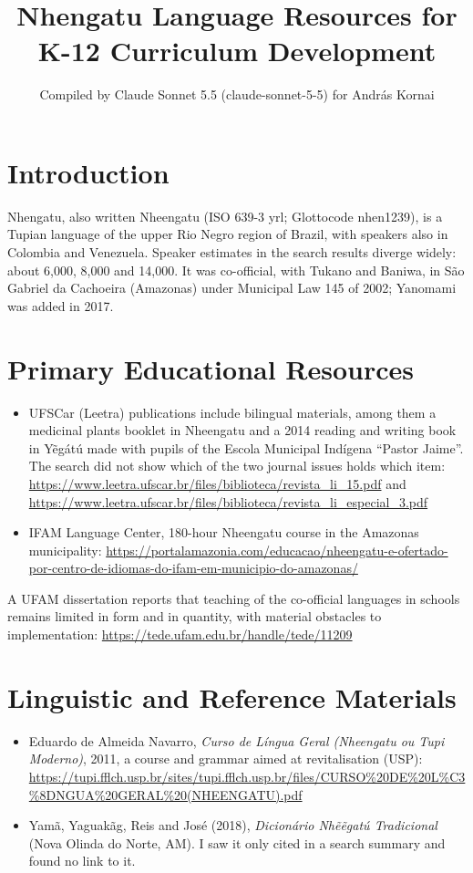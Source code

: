 \documentclass[12pt]{article}
\title{Nhengatu Language Resources for K-12 Curriculum Development}
\author{Compiled by Claude Sonnet 5.5 (claude-sonnet-5-5) for Andr\'as Kornai}
\date{}
\begin{document}
\maketitle

\section{Introduction}
Nhengatu, also written Nheengatu (ISO 639-3 yrl; Glottocode nhen1239), is a Tupian language of the upper Rio Negro region of Brazil, with speakers also in Colombia and Venezuela. Speaker estimates in the search results diverge widely: about 6,000, 8,000 and 14,000. It was co-official, with Tukano and Baniwa, in S\~ao Gabriel da Cachoeira (Amazonas) under Municipal Law 145 of 2002; Yanomami was added in 2017.

\section{Primary Educational Resources}
\begin{itemize}
\item UFSCar (Leetra) publications include bilingual materials, among them a medicinal plants booklet in Nheengatu and a 2014 reading and writing book in Y\~eg\'at\'u made with pupils of the Escola Municipal Ind\'igena ``Pastor Jaime''. The search did not show which of the two journal issues holds which item: \url{https://www.leetra.ufscar.br/files/biblioteca/revista_li_15.pdf} and \url{https://www.leetra.ufscar.br/files/biblioteca/revista_li_especial_3.pdf}
\item IFAM Language Center, 180-hour Nheengatu course in the Amazonas municipality: \url{https://portalamazonia.com/educacao/nheengatu-e-ofertado-por-centro-de-idiomas-do-ifam-em-municipio-do-amazonas/}
\end{itemize}
A UFAM dissertation reports that teaching of the co-official languages in schools remains limited in form and in quantity, with material obstacles to implementation: \url{https://tede.ufam.edu.br/handle/tede/11209}

\section{Linguistic and Reference Materials}
\begin{itemize}
\item Eduardo de Almeida Navarro, \emph{Curso de L\'ingua Geral (Nheengatu ou Tupi Moderno)}, 2011, a course and grammar aimed at revitalisation (USP): \url{https://tupi.fflch.usp.br/sites/tupi.fflch.usp.br/files/CURSO%20DE%20L\%C3\%8DNGUA%20GERAL%20(NHEENGATU).pdf}
\item Yam\~a, Yaguak\~ag, Reis and Jos\'e (2018), \emph{Dicion\'ario Nh\~e\~egat\'u Tradicional} (Nova Olinda do Norte, AM). I saw it only cited in a search summary and found no link to it.
\end{itemize}
\end{document}
